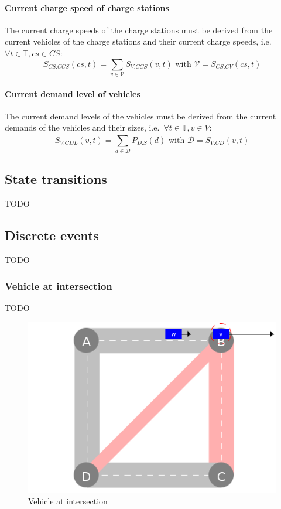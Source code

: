 \documentclass{IEEEtran}
\begin{document}
    \paragraph{Current charge speed of charge stations}
    The current charge speeds of the charge stations must be derived from the current vehicles of the charge stations and their current charge speeds, i.e.\ $\forall t \in \mathbb{T}, cs \in CS:$
    \[
        S_{CS.CCS}(cs,t)=\sum_{v \in \mathcal{V}}S_{V.CCS}(v,t) \textrm{ with } \mathcal{V}=S_{CS.CV}(cs,t)
    \]

    \paragraph{Current demand level of vehicles}
    The current demand levels of the vehicles must be derived from the current demands of the vehicles and their sizes, i.e.\ $\forall t \in \mathbb{T}, v \in V:$
    \[
        S_{V.CDL}(v,t)=\sum_{d \in \mathcal{D}}^{}P_{D.S}(d) \textrm{ with } \mathcal{D}=S_{V.CD}(v,t)
    \]

    \subsection{State transitions}
    \label{sec:transitions}
    TODO

    \subsection{Discrete events}
    \label{sec:events}
    TODO

    \subsubsection{Vehicle at intersection}
    TODO

    \begin{figure}[htbp]
        \centering
        \includegraphics[scale=0.5]{../../events/vehicle-at-intersection.png}
        \caption{Vehicle at intersection}
        \label{fig:vehicle-at-intersection}
    \end{figure}
\end{document}
